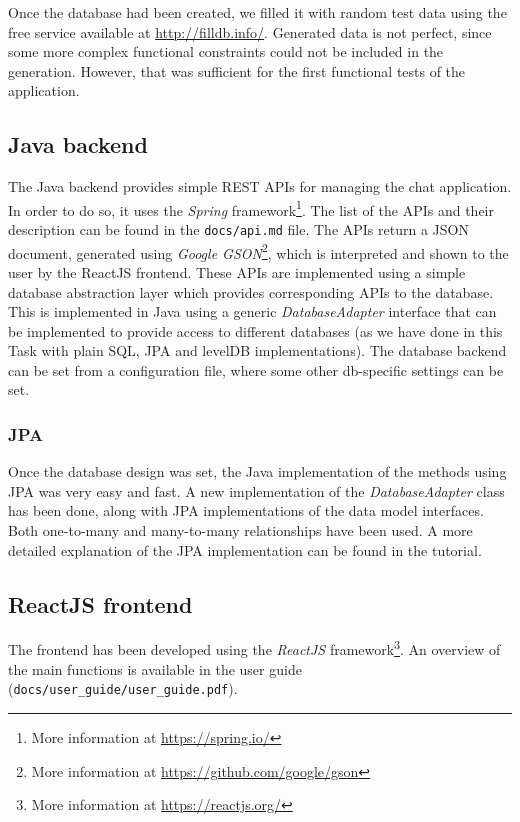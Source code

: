 \documentclass[10pt]{article}
\begin{document}
Once the database had been created, we filled it with random test data using the free
service available at \url{http://filldb.info/}. Generated data is not perfect, 
since some more complex functional constraints could not be included in the 
generation. However, that was sufficient for the first functional tests of the
application.

\subsection{Java backend}
The Java backend provides simple REST APIs for managing the chat application. 
In order to do so, it uses the \emph{Spring} framework\footnote{More information
at \url{https://spring.io/}}.
The list of the APIs and their description can be found in the 
\texttt{docs/api.md} file. The APIs return a JSON document, generated using
\emph{Google GSON}\footnote{More information at 
\url{https://github.com/google/gson}}, which is interpreted and shown to the user
by the ReactJS frontend.
These APIs are implemented using a simple database abstraction layer which provides 
corresponding APIs to the database. This is implemented in Java 
using a generic \emph{DatabaseAdapter} interface that can be implemented to 
provide access to different databases (as we have done in this Task with plain SQL, 
JPA and levelDB implementations). The database backend can be set from a configuration
file, where some other db-specific settings can be set.

\subsubsection{JPA}
Once the database design was set, the Java implementation of the methods using 
JPA was very easy and fast. A new implementation of the \emph{DatabaseAdapter}
class has been done, along with JPA implementations of the data model interfaces.
Both one-to-many and many-to-many relationships have been used. A more detailed 
explanation of the JPA implementation can be found in the tutorial.

\subsection{ReactJS frontend}
The frontend has been developed using the \emph{ReactJS} framework\footnote{More
information at \url{https://reactjs.org/}}. An overview of the main functions 
is available in the user guide (\texttt{docs/user\_guide/user\_guide.pdf}).
\end{document}

